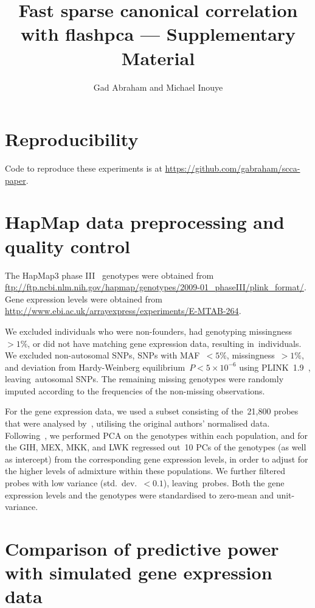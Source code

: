 \documentclass[a4paper,10pt]{article}
\author{Gad Abraham and Michael Inouye}
\title{Fast sparse canonical correlation with flashpca --- Supplementary
Material}
\begin{document}
\maketitle

\section{Reproducibility}

Code to reproduce these experiments is at
\url{https://github.com/gabraham/scca-paper}.

\section{HapMap data preprocessing and quality control}

The HapMap3 phase III~\citep{hapmap2010} genotypes were obtained from
\url{ftp://ftp.ncbi.nlm.nih.gov/hapmap/genotypes/2009-01_phaseIII/plink_format/}.
Gene expression levels were obtained from
\url{http://www.ebi.ac.uk/arrayexpress/experiments/E-MTAB-264}.

We excluded individuals who were non-founders, had genotyping
missingness~${>}1\%$, or did not have matching gene expression data,
resulting in~\nindiv individuals. We excluded non-autosomal SNPs, SNPs
with MAF~${<}5\%$, missingness~${>}1\%$, and deviation from Hardy-Weinberg
equilibrium~$P{<}5\times10^{-6}$ using PLINK~1.9~\citep{purcell2007,Chang2015},
leaving~\nsnps autosomal SNPs. The remaining missing genotypes were randomly
imputed according to the frequencies of the non-missing observations.

For the gene expression data, we used a subset consisting of the~21,800 probes
that were analysed by~\citep{Stranger2012}, utilising the original authors'
normalised data. Following~\citep{Stranger2012}, we performed PCA on the
genotypes within each population, and for the GIH, MEX, MKK, and LWK regressed
out~10 PCs of the genotypes (as well as intercept) from the corresponding gene
expression levels, in order to adjust for the higher levels of admixture within
these populations.  We further filtered probes with low variance
(std.~dev.~${<}0.1$), leaving~\ngenes probes. Both the gene expression levels and
the genotypes were standardised to zero-mean and unit-variance.

\section{Comparison of predictive power with simulated gene expression data}
\label{section:sim}
\end{document}

